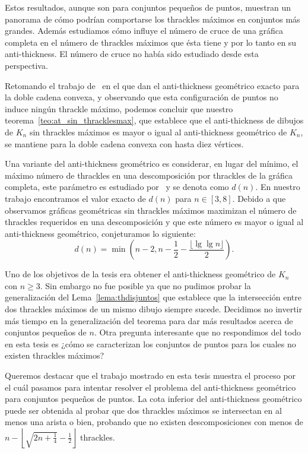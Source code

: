 Estos resultados, aunque son para conjuntos pequeños de puntos, muestran un panorama de cómo podrían
comportarse los thrackles máximos en conjuntos más grandes. Además estudiamos cómo influye el número de
cruce de una gráfica completa en el número de thrackles máximos que ésta tiene y por lo tanto en su
anti-thickness. El número de cruce no había sido estudiado desde esta perspectiva.

Retomando el trabajo de~\cite{Lomeli2018} en el que dan el anti-thickness geométrico exacto para la doble
cadena convexa, y observando que esta configuración de puntos no induce ningún thrackle máximo, podemos
concluir que nuestro teorema~\ref{teo:at_sin_thracklesmax}, que establece que el anti-thickness de dibujos
de $K_n$ sin thrackles máximos es mayor o igual al anti-thickness geométrico de $K_n$, se mantiene para la
doble cadena convexa con hasta diez vértices.

Una variante del anti-thickness geométrico es considerar, en lugar del mínimo, el máximo número de
thrackles en una descomposición por thrackles de la gráfica completa, este parámetro es estudiado
por~\cite{Araujo2005} y se denota como $d(n)$. En nuestro trabajo encontramos el valor exacto de $d(n)$
para $n \in [3,8]$. Debido a que observamos gráficas geométricas sin thrackles máximos maximizan el número de thrackles requeridos en una descomposición y que este número es mayor o igual al anti-thickness geométrico, conjeturamos lo siguiente:
\[
d(n) =  \min\left(n-2,n-\frac{1}{2}-\frac{\lfloor \lg \lg n\rfloor}{2}\right).
\]

Uno de los objetivos de la tesis era obtener el anti-thickness geométrico de $K_n$ con $n\geq 3$. Sin
embargo no fue posible ya que no pudimos probar la generalización del Lema~\ref{lema:thdisjuntos} que
establece que la intersección entre dos thrackles máximos de un mismo dibujo siempre sucede. Decidimos no
invertir más tiempo en la generalización del teorema para dar más resultados acerca de conjuntos pequeños de
$n$. Otra pregunta interesante que no respondimos del todo en esta tesis es ¿cómo se caracterizan los
conjuntos de puntos para los cuales no existen thrackles máximos?

Queremos destacar que el trabajo mostrado en esta tesis muestra el proceso por el cuál pasamos para
intentar resolver el problema del anti-thickness geométrico para conjuntos pequeños de puntos. La cota
inferior del anti-thickness geométrico puede ser obtenida al probar que dos thrackles máximos se
intersectan en al menos una arista o bien, probando que no existen descomposiciones con menos de $n -
\left\lfloor \sqrt{2n + \frac{1}{4}} - \frac{1}{2}\right\rfloor$ thrackles.

